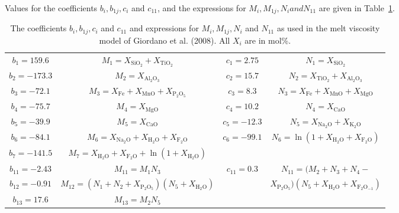 \documentclass[]{book}
\theoremstyle{definition}
\begin{document}
\begin{enumerate}
  Values for the coefficients $b_{i}, b_{1j}, c_{i}$ and $c_{11}$, and the expressions for $M_{i}, M_{1j}, N_{i} and N_{11}$ are given in Table~\ref{tab:viscos}.

  \begin{table}
    \caption{The coefficients $b_{i}, b_{1j}, c_{i}$ and $c_{11}$ and expressions for $M_{i}, M_{1j}, N_{i}$ and $N_{11}$ as used in the melt viscosity model of Giordano et al. (2008). All $X_{i}$ are in mol\%.\label{tab:viscos}}
    \begin{tabular}{|c|c||c|c|}
      \hline
      $b_{1} = 159.6$ & $M_{1} = X_{\text{SiO}_{2}} + X_{\text{TiO}_{2}}$ & $c_{1} = 2.75$ & $N_{1} = X_{\text{SiO}_{2}}$ \\
      $b_{2} = -173.3$ & $M_{2} = X_{\text{Al}_{2}\text{O}_{3}}$ & $c_{2} = 15.7$ & $N_{2} = X_{\text{TiO}_{2}} + X_{\text{Al}_{2}\text{O}_{3}}$ \\
      $b_{3} = -72.1$ & $M_{3} = X_{\text{Fe}} + X_{\text{MnO}} + X_{\text{P}_{2}\text{O}_{5}}$ & $c_{3} = 8.3$ & $N_{3} = X_{\text{Fe}} + X_{\text{MnO}} + X_{\text{MgO}}$ \\
      $b_{4} = -75.7$ & $M_{4} = X_{\text{MgO}}$ & $c_{4} = 10.2$ & $N_{4} = X_{\text{CaO}}$ \\
      $b_{5} = -39.9$ & $M_{5} = X_{\text{CaO}}$ & $c_{5} = -12.3$ & $N_{5} = X_{\text{Na}_{2}\text{O}} + X_{\text{K}_{2}\text{O}}$ \\
      $b_{6} = -84.1$ & $M_{6} = X_{\text{Na}_{2}\text{O}} + X_{\text{H}_{2}\text{O}} + X_{\text{F}_{2}\text{O}}$ & $c_{6} = -99.1$ & $N_{6} = \ln(1 + X_{\text{H}_{2}\text{O}} + X_{\text{F}_{2}\text{O}})$ \\
      $b_{7} = -141.5$ & $M_{7} = X_{\text{H}_{2}\text{O}} + X_{\text{F}_{2}\text{O}} + \ln(1 + X_{\text{H}_{2}\text{O}})$& &  \\
      \hline
      $b_{11} = -2.43$ & $M_{11} = M_{1} N_{3}$ & $c_{11} = 0.3$& $N_{11} = (M_{2} + N_{3} + N_{4} - $\\
      $b_{12} = -0.91$ & $M_{12} = (N_{1} + N_{2} + X_{\text{P}_{2}\text{O}_{5}}) (N_{5} + X_{\text{H}_{2}\text{O}})$ & & $X_{\text{P}_{2}\text{O}_{5}}) (N_{5} + X_{\text{H}_{2}\text{O}} + X_{\text{F}_{2}\text{O}_{-1}})$ \\
      $b_{13} = 17.6$ & $M_{13} = M_{2} N_{5}$ & &  \\    
      \hline
    \end{tabular}
  \end{table}


\end{enumerate}
\end{document}
